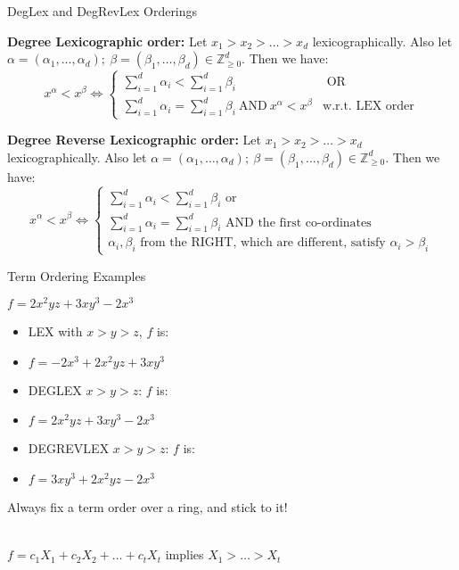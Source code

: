\documentclass[xcolor=dvipsnames]{beamer}
\newcommand{\bi}{\begin{itemize}}
\newcommand{\ei}{\end{itemize}}
\begin{document}
\begin{frame}{{\large DegLex and DegRevLex Orderings}}


\begin{Definition}[DEGLEX]
{\bf Degree Lexicographic order:} Let $x_1 > x_2 > \dots > x_d$
lexicographically. Also let $\alpha = (\alpha_1, \dots, \alpha_d);
~\beta = (\beta_1, \dots, \beta_d) \in \mathbb{Z}^d_{\geq 0}$. Then we
have: 
\begin{equation*}
x^{\alpha} < x^{\beta} \iff 
\begin{cases}
\sum_{i=1}^{d}\alpha_i < \sum_{i=1}^{d} \beta_i & \text{ OR }\\
\sum_{i=1}^{d}\alpha_i = \sum_{i=1}^{d} \beta_i  ~\text{AND}~
x^{\alpha} < x^{\beta} & \text{w.r.t. LEX order}
\end{cases}
\end{equation*}
\end{Definition}


\begin{Definition}[DEGREVLEX]
{\bf Degree Reverse Lexicographic order:} Let $x_1 > x_2 > \dots > x_d$
lexicographically. Also let $\alpha = (\alpha_1, \dots, \alpha_d);
~\beta = (\beta_1, \dots, \beta_d) \in \mathbb{Z}^d_{\geq 0}$. Then we
have: 
\begin{equation*}
x^{\alpha} < x^{\beta} \iff 
\begin{cases}
\sum_{i=1}^{d}\alpha_i < \sum_{i=1}^{d} \beta_i  \text{ or }\\
\sum_{i=1}^{d}\alpha_i = \sum_{i=1}^{d} \beta_i  \text{ AND the first co-ordinates}\\
\text{$\alpha_i, \beta_i$ from the RIGHT, which are different, satisfy
  $\alpha_i > \beta_i$}
\end{cases}
\end{equation*}

\end{Definition}


\end{frame}


\begin{frame}{{\large Term Ordering Examples}}

$f = 2x^2yz + 3xy^3 - 2x^3$\\

\bi [<+->]
\item LEX with $x > y > z$, $f$ is:
\item $f = -2x^3 + 2x^2yz + 3xy^3$
\item  DEGLEX $x>y>z$:  $f$ is:
\item $f = 2x^2yz + 3xy^3 -2x^3$
\item DEGREVLEX $x>y>z$: $f$ is: 
\item $f  = 3xy^3 + 2x^2yz - 2x^3$
\ei

\pause

Always fix a term order over a ring, and stick to it!

\ \\
\pause
$f = c_1 X_1 + c_2 X_2 + \dots + c_t X_t$ implies $X_1 > \dots > X_t$
\end{frame}
\end{document}
